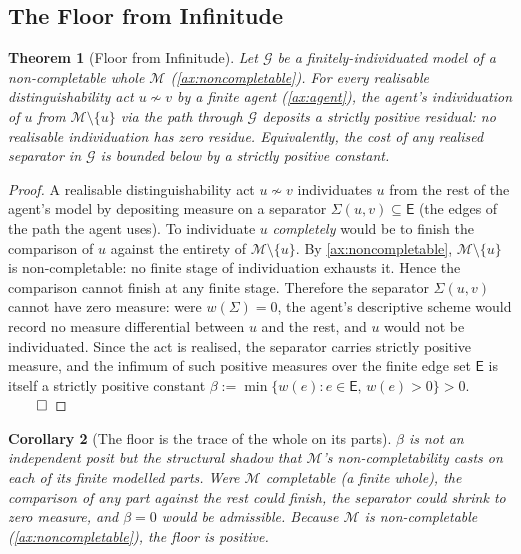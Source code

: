 \documentclass[11pt,twocolumn,a4paper]{article}
\theoremstyle{thmstyle}
\newtheorem{theorem}{Theorem}[section]
\newtheorem{corollary}[theorem]{Corollary}
\theoremstyle{definition}
\theoremstyle{remark}
\newcommand{\Graph}{\mathcal{G}}
\newcommand{\Edg}{\mathsf{E}}
\newcommand{\floor}{\beta}
\begin{document}
\subsection{The Floor from Infinitude}

\begin{theorem}[Floor from Infinitude]
\label{thm:floor_from_infinitude}
Let $\Graph$ be a finitely-individuated model of a non-completable
whole $\mathcal{M}$ (\cref{ax:noncompletable}). For every realisable
distinguishability act $u \not\sim v$ by a finite agent
(\cref{ax:agent}), the agent's individuation of $u$ from
$\mathcal{M}\setminus\{u\}$ via the path through $\Graph$ deposits a
strictly positive residual: no realisable individuation has zero
residue. Equivalently, the cost of any realised separator in
$\Graph$ is bounded below by a strictly positive constant.
\end{theorem}

\begin{proof}
A realisable distinguishability act $u \not\sim v$ individuates $u$
from the rest of the agent's model by depositing measure on a
separator $\Sigma(u, v) \subseteq \Edg$ (the edges of the path the
agent uses). To individuate $u$ \emph{completely} would be to
finish the comparison of $u$ against the entirety of
$\mathcal{M}\setminus\{u\}$. By \cref{ax:noncompletable},
$\mathcal{M}\setminus\{u\}$ is non-completable: no finite stage of
individuation exhausts it. Hence the comparison cannot finish at
any finite stage. Therefore the separator $\Sigma(u, v)$ cannot
have zero measure: were $w(\Sigma) = 0$, the agent's descriptive
scheme would record no measure differential between $u$ and the
rest, and $u$ would not be individuated. Since the act is realised,
the separator carries strictly positive measure, and the infimum of
such positive measures over the finite edge set $\Edg$ is itself a
strictly positive constant
$\floor := \min\{w(e) : e \in \Edg,\, w(e) > 0\} > 0$. $\qed$
\end{proof}

\begin{corollary}[The floor is the trace of the whole on its
parts]
\label{cor:floor_trace}
$\floor$ is not an independent posit but the structural shadow that
$\mathcal{M}$'s non-completability casts on each of its finite
modelled parts. Were $\mathcal{M}$ completable (a finite whole),
the comparison of any part against the rest could finish, the
separator could shrink to zero measure, and $\floor = 0$ would be
admissible. Because $\mathcal{M}$ is non-completable
(\cref{ax:noncompletable}), the floor is positive.
\end{corollary}
\end{document}
